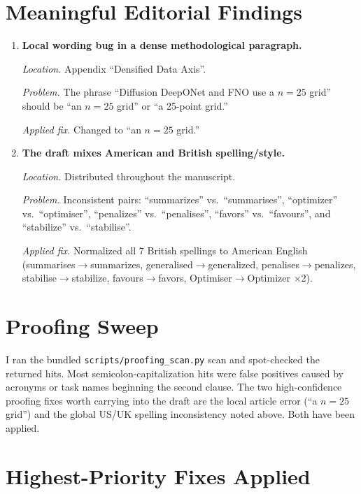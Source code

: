 \documentclass[11pt]{article}
\begin{document}
\section*{Meaningful Editorial Findings}

\begin{enumerate}
\item \textbf{Local wording bug in a dense methodological paragraph.}

\emph{Location.} Appendix ``Densified Data Axis''.

\emph{Problem.} The phrase ``Diffusion DeepONet and FNO use a $n = 25$ grid'' should be ``an $n = 25$ grid'' or ``a 25-point grid.''

\emph{Applied fix.} Changed to ``an $n = 25$ grid.''

\item \textbf{The draft mixes American and British spelling/style.}

\emph{Location.} Distributed throughout the manuscript.

\emph{Problem.} Inconsistent pairs: ``summarizes'' vs.\ ``summarises'', ``optimizer'' vs.\ ``optimiser'', ``penalizes'' vs.\ ``penalises'', ``favors'' vs.\ ``favours'', and ``stabilize'' vs.\ ``stabilise''.

\emph{Applied fix.} Normalized all 7 British spellings to American English (summarises$\to$summarizes, generalised$\to$generalized, penalises$\to$penalizes, stabilise$\to$stabilize, favours$\to$favors, Optimiser$\to$Optimizer $\times$2).
\end{enumerate}

\section*{Proofing Sweep}

I ran the bundled \texttt{scripts/proofing\_scan.py} scan and spot-checked the returned hits. Most semicolon-capitalization hits were false positives caused by acronyms or task names beginning the second clause. The two high-confidence proofing fixes worth carrying into the draft are the local article error (``a $n = 25$ grid'') and the global US/UK spelling inconsistency noted above. Both have been applied.

\section*{Highest-Priority Fixes Applied}
\end{document}
